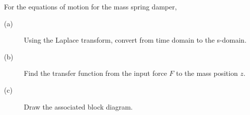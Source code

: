 For the equations of motion for the mass spring damper,
    \begin{description}\item[]
    \item[(a)] Using the Laplace transform, convert from time domain to the s-domain.
    \item[(b)] Find the transfer function from the input force $F$ to the mass position $z$.
    \item[(c)] Draw the associated block diagram.
    \end{description}
